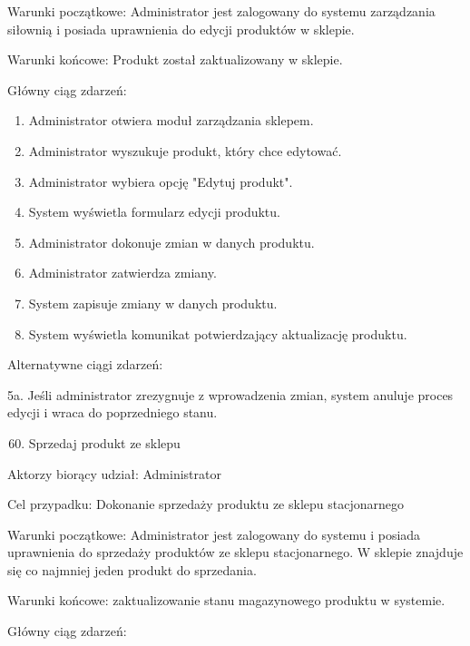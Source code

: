 \documentclass[
]{article}
\providecommand{\tightlist}{%
  \setlength{\itemsep}{0pt}\setlength{\parskip}{0pt}}
\begin{document}
{Warunki początkowe: Administrator jest zalogowany do systemu
zarządzania siłownią i posiada uprawnienia do edycji produktów w
sklepie.}

{Warunki końcowe: Produkt został zaktualizowany w sklepie.}

{Główny ciąg zdarzeń:}

\begin{enumerate}
\tightlist
\item
  {Administrator otwiera moduł zarządzania sklepem.}
\item
  {Administrator wyszukuje produkt, który chce edytować.}
\item
  {Administrator wybiera opcję "Edytuj produkt".}
\item
  {System wyświetla formularz edycji produktu.}
\item
  {Administrator dokonuje zmian w danych produktu.}
\item
  {Administrator zatwierdza zmiany.}
\item
  {System zapisuje zmiany w danych produktu.}
\item
  {System wyświetla komunikat potwierdzający aktualizację produktu.}
\end{enumerate}

{Alternatywne ciągi zdarzeń:}

{5a. Jeśli administrator zrezygnuje z wprowadzenia zmian, system anuluje
proces edycji i wraca do poprzedniego stanu.}

{}

\begin{enumerate}
\setcounter{enumi}{59}
\tightlist
\item
  {Sprzedaj produkt ze sklepu}
\end{enumerate}

{Aktorzy biorący udział: Administrator}

{Cel przypadku: Dokonanie sprzedaży produktu ze sklepu stacjonarnego}

{Warunki początkowe: Administrator jest zalogowany do systemu i posiada
uprawnienia do sprzedaży produktów ze sklepu stacjonarnego. W sklepie
znajduje się co najmniej jeden produkt do sprzedania.}

{Warunki końcowe: zaktualizowanie stanu magazynowego produktu w
systemie.}

{Główny ciąg zdarzeń:}
\end{document}
